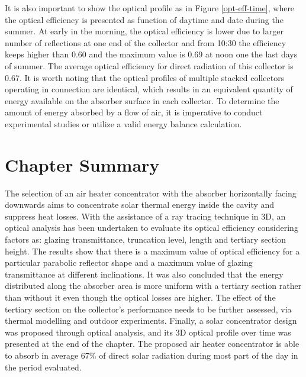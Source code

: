 It is also important to show the optical profile as in Figure \ref{opt-eff-time}, where the optical efficiency is presented as function of daytime and date during the summer. At early in the morning, the optical efficiency is lower due to larger number of reflections at one end of the collector and from 10:30 the efficiency keeps higher than 0.60 and the maximum value is 0.69 at noon one the last days of summer. The average optical efficiency for direct radiation of this collector is 0.67. It is worth noting that the optical profiles of multiple stacked collectors operating in connection are identical, which results in an equivalent quantity of energy available on the absorber surface in each collector. To determine the amount of energy absorbed by a flow of air, it is imperative to conduct experimental studies or utilize a valid energy balance calculation.


\section{Chapter Summary}

The selection of an air heater concentrator with the absorber horizontally facing downwards aims to concentrate solar thermal energy inside the cavity and suppress heat losses. With the assistance of a ray tracing technique in 3D, an optical analysis has been undertaken to evaluate its optical efficiency considering factors as: glazing transmittance, truncation level, length and tertiary section height. The results show that there is a maximum value of optical efficiency for a particular parabolic reflector shape and a maximum value of glazing transmittance at different inclinations. It was also concluded that the energy distributed along the absorber area is more uniform with a tertiary section rather than without it even though the optical losses are higher. The effect of the tertiary section on the collector's performance needs to be further assessed, via thermal modelling and outdoor experiments. Finally, a solar concentrator design was proposed through optical analysis, and its 3D optical profile over time was presented at the end of the chapter. The proposed air heater concentrator is able to absorb in average 67\% of direct solar radiation during most part of the day in the period evaluated.


